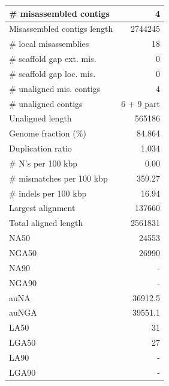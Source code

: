 \documentclass[12pt,a4paper]{article}
\begin{document}
\begin{table}[ht]
\begin{center}
\begin{tabular}{|l*{1}{|r}|}
\# misassembled contigs & 4 \\ \hline
Misassembled contigs length & 2744245 \\ \hline
\# local misassemblies & 18 \\ \hline
\# scaffold gap ext. mis. & 0 \\ \hline
\# scaffold gap loc. mis. & 0 \\ \hline
\# unaligned mis. contigs & 4 \\ \hline
\# unaligned contigs & 6 + 9 part \\ \hline
Unaligned length & 565186 \\ \hline
Genome fraction (\%) & 84.864 \\ \hline
Duplication ratio & 1.034 \\ \hline
\# N's per 100 kbp & 0.00 \\ \hline
\# mismatches per 100 kbp & 359.27 \\ \hline
\# indels per 100 kbp & 16.94 \\ \hline
Largest alignment & 137660 \\ \hline
Total aligned length & 2561831 \\ \hline
NA50 & 24553 \\ \hline
NGA50 & 26990 \\ \hline
NA90 & - \\ \hline
NGA90 & - \\ \hline
auNA & 36912.5 \\ \hline
auNGA & 39551.1 \\ \hline
LA50 & 31 \\ \hline
LGA50 & 27 \\ \hline
LA90 & - \\ \hline
LGA90 & - \\ \hline
\end{tabular}
\end{center}
\end{table}
\end{document}
